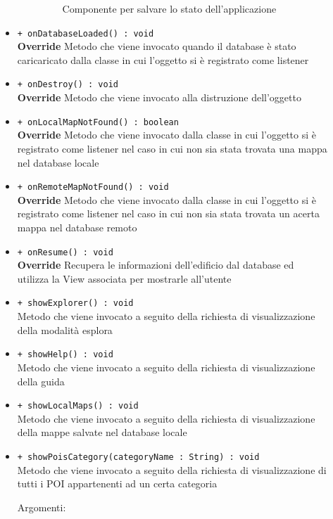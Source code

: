 \documentclass[../DefinizioneDiProdotto.tex]{subfiles}
\begin{document}
\begin{description}
\begin{itemize}
\begin{description}
\begin{itemize}
				Componente per salvare lo stato dell'applicazione\end{itemize}
		\end{description}
		\item \texttt{+ onDatabaseLoaded() : void}\\
		\textbf{Override} Metodo che viene invocato quando il database è stato caricaricato dalla classe in cui l'oggetto si è registrato come listener
		\item \texttt{+ onDestroy() : void}\\
		\textbf{Override} Metodo che viene invocato alla distruzione dell'oggetto
		\item \texttt{+ onLocalMapNotFound() : boolean}\\
		\textbf{Override} Metodo che viene invocato dalla classe in cui l'oggetto si è registrato come listener nel caso in cui non sia stata trovata una mappa nel database locale
		\item \texttt{+ onRemoteMapNotFound() : void}\\
		\textbf{Override} Metodo che viene invocato dalla classe in cui l'oggetto si è registrato come listener nel caso in cui non sia stata trovata un acerta mappa nel database remoto
		\item \texttt{+ onResume() : void}\\
		\textbf{Override} Recupera le informazioni dell'edificio dal database ed utilizza la View associata per mostrarle all'utente
		\item \texttt{+ showExplorer() : void}\\
		Metodo che viene invocato a seguito della richiesta di visualizzazione della modalità esplora
		\item \texttt{+ showHelp() : void}\\
		Metodo che viene invocato a seguito della richiesta di visualizzazione della guida
		\item \texttt{+ showLocalMaps() : void}\\
		Metodo che viene invocato a seguito della richiesta di visualizzazione della mappe salvate nel database locale
		\item \texttt{+ showPoisCategory(categoryName : String) : void}\\
		Metodo che viene invocato a seguito della richiesta di visualizzazione di tutti i POI appartenenti ad un certa categoria
		\begin{description}
			\item[Argomenti:] \
			\begin{itemize}

\end{itemize}
\end{description}
\end{itemize}
\end{description}
\end{document}

